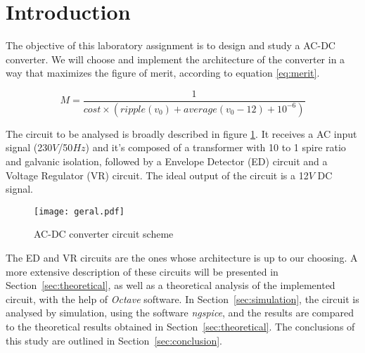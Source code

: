 \section{Introduction}
\label{sec:introduction}

\par The objective of this laboratory assignment is to design and study a AC-DC converter. We will choose and implement the architecture of the converter in a way that maximizes the figure of merit, according to equation \ref{eq:merit}.

\begin{equation}
    M = \frac{1}{cost \times (ripple(v_0) + average (v_0 - 12) + 10^{-6})}
    \label{eq:merit}
\end{equation}

The circuit to be analysed is broadly described in figure \ref{fig:circuit}. It receives a AC input signal (230$V$/50$Hz$) and it's composed of a transformer with 10 to 1 spire ratio and galvanic isolation, followed by a Envelope Detector (ED) circuit and a Voltage Regulator (VR) circuit. The ideal output of the circuit is a 12$V$ DC signal. 

\begin{figure}[H]   
\centering
\texttt{[image: geral.pdf]}
\caption{AC-DC converter circuit scheme}
\label{fig:circuit}
\end{figure}

\par The ED and VR circuits are the ones whose architecture is up to our choosing. A more extensive description of these circuits will be presented in Section~\ref{sec:theoretical}, as well as a theoretical analysis of the implemented circuit, with the help of \textit{Octave} software. In Section~\ref{sec:simulation}, the circuit is analysed by simulation, using the software \textit{ngspice}, and the results are compared to the theoretical results obtained in Section~\ref{sec:theoretical}. The conclusions of this study are outlined in Section~\ref{sec:conclusion}.